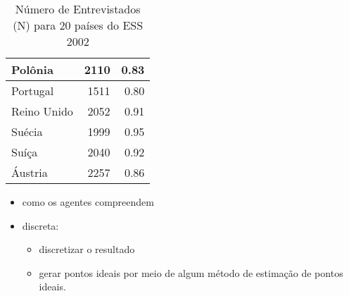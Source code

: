 \begin{table}[h]
\begin{tabular}{|l|r|r|}
Polônia         & 2110             & 0.83                           \\ \hline
Portugal        & 1511             & 0.80                           \\ \hline
Reino Unido     & 2052             & 0.91                           \\ \hline
Suécia          & 1999             & 0.95                           \\ \hline
Suíça           & 2040             & 0.92                           \\ \hline
Áustria         & 2257             & 0.86                           \\ \hline
\end{tabular}
\caption{Número de Entrevistados (N) para 20 países do ESS 2002}
\end{table}

\begin{tcolorbox}
  \begin{itemize}
  \item como os agentes compreendem
  \item discreta:
    \begin{itemize}
    \item discretizar o resultado
    \item gerar pontos ideais por meio de algum método de estimação de pontos ideais.
    \end{itemize}

  \end{itemize}
\end{tcolorbox}